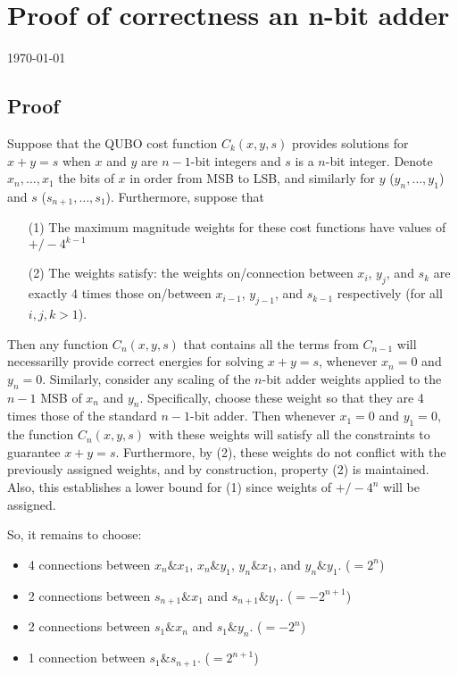 \documentclass[12pt]{article}
\begin{document}
\section*{Proof of correctness an n-bit adder}
\today

\subsection*{Proof}

Suppose that the QUBO cost function $C_k(x,y,s)$ provides solutions for
$x+y=s$ when $x$ and $y$ are $n-1$-bit integers and $s$ is a $n$-bit
integer.
Denote $x_n, \ldots, x_1$ the bits of $x$ in order from MSB to LSB, and
similarly for $y$ ($y_n, \ldots, y_1$) and $s$ ($s_{n+1}, \ldots, s_1$).
Furthermore, suppose that
\begin{enumerate}
\item[(1)] The maximum magnitude weights for these
cost functions have values of $+/- 4^{k-1}$
\item[(2)] The weights satisfy: the weights on/connection between
$x_i$, $y_j$, and $s_k$ are exactly 4 times those on/between
$x_{i-1}$, $y_{j-1}$, and $s_{k-1}$
respectively (for all $i,j,k > 1$).
\end{enumerate}
Then any function $C_n(x,y,s)$ that contains all the terms from
$C_{n-1}$ will necessarilly provide correct energies for solving $x+y=s$,
whenever $x_n = 0$ and $y_n = 0$.
Similarly, consider any scaling of the $n$-bit adder weights applied
to the $n-1$ MSB of $x_n$ and $y_n$. 
Specifically, choose these weight so that they are 4 times those of the
standard $n-1$-bit adder.
Then whenever $x_1=0$ and $y_1=0$, the function $C_n(x,y,s)$ with these
weights will satisfy all the constraints to guarantee $x+y=s$.
Furthermore, by (2), these weights do not conflict with the previously
assigned weights, and by construction, property (2) is maintained.
Also, this establishes a lower bound for (1) since weights of
$+/- 4^n$ will be assigned.

So, it remains to choose:
\begin{itemize}
\item 4 connections between $x_n \& x_1$, $x_n \& y_1$, $y_n \& x_1$,
and $y_n \& y_1$. ($=2^n$)
\item 2 connections between $s_{n+1} \& x_1$ and $s_{n+1} \& y_1$.
($=-2^{n+1}$)
\item 2 connections between $s_1 \& x_n$ and $s_1 \& y_n$.
($=-2^n$)
\item 1 connection between $s_1 \& s_{n+1}$. ($=2^{n+1}$)
\end{itemize}
\end{document}
